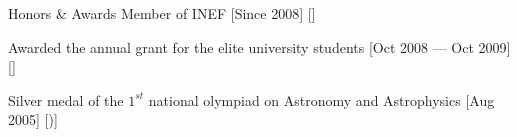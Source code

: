 \begin{cvsection}{Honors \& Awards}
    \cvitem
    {Member of INEF}
    [Since 2008]
    [\INEF]
    
    \cvitem
    {Awarded the annual grant for the elite university students}
    [Oct 2008 --- Oct 2009]
    [\INEF]
    
    \cvitem
    {Silver medal of the $1^{st}$ national olympiad on Astronomy and Astrophysics}
    [Aug 2005]
    [\YSC)]
\end{cvsection}